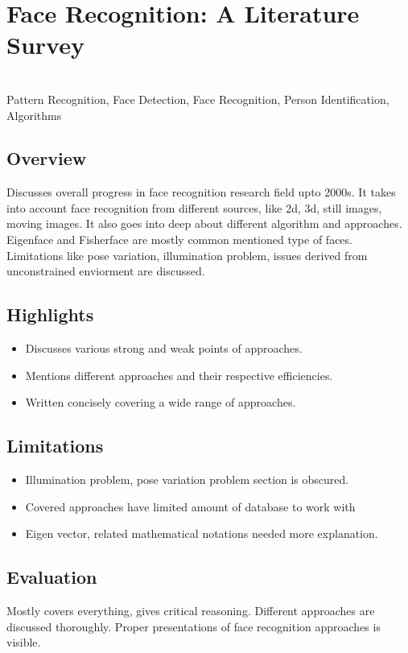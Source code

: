 \section{Face Recognition: A Literature Survey}

 \\
Pattern Recognition, Face Detection, Face Recognition, Person Identification, Algorithms


\subsection{Overview}
Discusses overall progress in face recognition research field upto 2000s. It takes into account face recognition from different sources, like 2d, 3d, still images, moving images. It also goes into deep about different algorithm and approaches. Eigenface and Fisherface are mostly common mentioned type of faces. Limitations like pose variation, illumination problem, issues derived from unconstrained enviorment are discussed\cite{zhaoFaceRecognitionLiterature2003}.  

\subsection{Highlights}
\begin{itemize}
    \item Discusses various strong and weak points of approaches.
    \item Mentions different approaches and their respective efficiencies.
    \item Written concisely covering a wide range of approaches.
\end{itemize}

\subsection{Limitations}
\begin{itemize}
    \item Illumination problem, pose variation problem section is obscured.
    \item Covered approaches have limited amount of database to work with
    \item Eigen vector, related mathematical notations needed more explanation.
\end{itemize}

\subsection{Evaluation}
Mostly covers everything, gives critical reasoning. Different approaches are discussed thoroughly. Proper presentations of face recognition approaches is visible.


